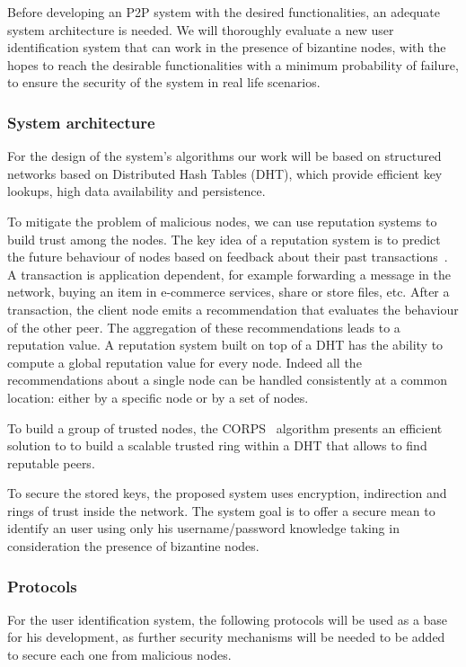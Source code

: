 \documentclass[12pt,spanish]{article}
\begin{document}
Before developing an P2P system with the desired functionalities, an adequate
system architecture is needed. We will thoroughly evaluate a new user
identification system that can work in the presence of bizantine nodes, with
the hopes to reach the desirable functionalities with a minimum probability of
failure, to ensure the security of the system in real life scenarios.

\subsubsection{System architecture}

For the design of the system's algorithms our work will be based on structured
networks based on Distributed Hash Tables (DHT), which provide efficient key
lookups, high data availability and persistence.

To mitigate the problem of malicious nodes, we can use reputation systems to
build trust among the nodes. The key
idea of a reputation system is to predict the future behaviour
of nodes based on feedback about their past
transactions~\cite{Resnick:2000:RS:355112.355122}. A
transaction is application dependent, for example forwarding a
message in the network, buying an item in e-commerce services,
share or store files, etc. After a transaction, the client node emits
a recommendation that evaluates the behaviour of the other peer.
The aggregation of these recommendations leads to a reputation
value.
A reputation system built on top of a DHT has the ability
to compute a global reputation value for every node. Indeed
all the recommendations about a single node can be handled
consistently at a common location: either by a specific node
or by a set of nodes.

To build a group of trusted nodes, the CORPS~\cite{rosas2011corps} algorithm
presents an efficient solution to to build a scalable
trusted ring within a DHT that allows to find reputable
peers.


To secure the stored keys, the proposed system uses encryption, indirection and
rings of trust inside the network. The system goal is to offer a secure mean to
identify an user using only his username/password knowledge taking in
consideration the presence of bizantine nodes.

\subsubsection{Protocols}
For the user identification system, the following protocols will be used as a
base for his development, as further security mechanisms will be needed to be
added to secure each one from malicious nodes.
\end{document}
